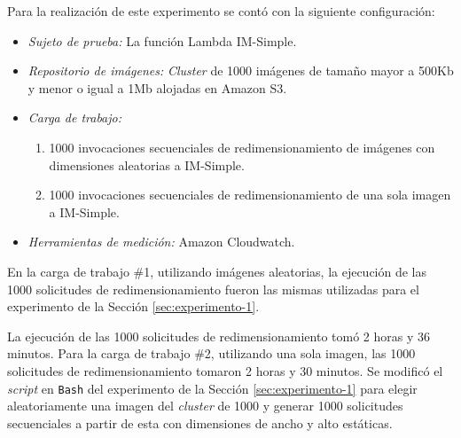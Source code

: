 Para la realización de este experimento se contó con la siguiente configuración:
\begin{itemize}
    \item \emph{Sujeto de prueba:} La función Lambda IM-Simple.
    \item \emph{Repositorio de imágenes:} \emph{Cluster} de 1000 imágenes de tamaño mayor a 500Kb y menor o igual a 1Mb alojadas en Amazon S3.
    \item \emph{Carga de trabajo:} 
    \begin{enumerate}
        \item 1000 invocaciones secuenciales de redimensionamiento de imágenes con dimensiones aleatorias a IM-Simple.
        \item 1000 invocaciones secuenciales de redimensionamiento de una sola imagen a IM-Simple.
    \end{enumerate}
    \item \emph{Herramientas de medición:} Amazon Cloudwatch.
\end{itemize}

En la carga de trabajo \#1, utilizando imágenes aleatorias, la ejecución de las 1000 solicitudes de redimensionamiento fueron las mismas utilizadas para el experimento de la Sección \ref{sec:experimento-1}. 

La ejecución de las 1000 solicitudes de redimensionamiento tomó 2 horas y 36 minutos. Para la carga de trabajo \#2, utilizando una sola imagen, las 1000 solicitudes de redimensionamiento tomaron 2 horas y 30 minutos. Se modificó el \emph{script} en \texttt{Bash} del experimento de la Sección \ref{sec:experimento-1} para elegir aleatoriamente una imagen del \emph{cluster} de 1000 y generar 1000 solicitudes secuenciales a partir de esta con dimensiones de ancho y alto estáticas.

